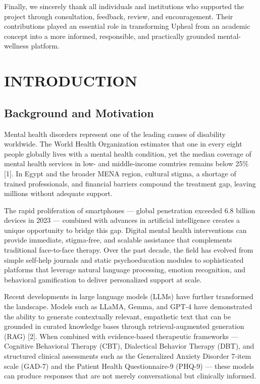 \documentclass[
  letterpaper,
  12pt,
  a4paper,
  openany]{report}
\begin{document}
Finally, we sincerely thank all individuals and institutions who
supported the project through consultation, feedback, review, and
encouragement. Their contributions played an essential role in
transforming Upheal from an academic concept into a more informed,
responsible, and practically grounded mental-wellness platform.


\chapter{INTRODUCTION}\label{sec-introduction}

\section{Background and Motivation}\label{sec-background-motivation}

Mental health disorders represent one of the leading causes of
disability worldwide. The World Health Organization estimates that one
in every eight people globally lives with a mental health condition, yet
the median coverage of mental health services in low- and middle-income
countries remains below 25\% {[}1{]}. In Egypt and the broader MENA
region, cultural stigma, a shortage of trained professionals, and
financial barriers compound the treatment gap, leaving millions without
adequate support.

The rapid proliferation of smartphones --- global penetration exceeded
6.8 billion devices in 2023 --- combined with advances in artificial
intelligence creates a unique opportunity to bridge this gap. Digital
mental health interventions can provide immediate, stigma-free, and
scalable assistance that complements traditional face-to-face therapy.
Over the past decade, the field has evolved from simple self-help
journals and static psychoeducation modules to sophisticated platforms
that leverage natural language processing, emotion recognition, and
behavioral gamification to deliver personalized support at scale.

Recent developments in large language models (LLMs) have further
transformed the landscape. Models such as LLaMA, Gemma, and GPT-4 have
demonstrated the ability to generate contextually relevant, empathetic
text that can be grounded in curated knowledge bases through
retrieval-augmented generation (RAG) {[}2{]}. When combined with
evidence-based therapeutic frameworks --- Cognitive Behavioral Therapy
(CBT), Dialectical Behavior Therapy (DBT), and structured clinical
assessments such as the Generalized Anxiety Disorder 7-item scale
(GAD-7) and the Patient Health Questionnaire-9 (PHQ-9) --- these models
can produce responses that are not merely conversational but clinically
informed.
\end{document}
